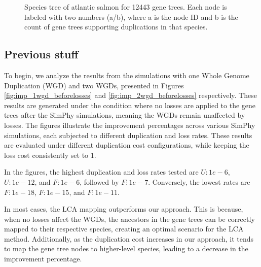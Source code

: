 \documentclass[10pt]{article}
\begin{document}
\begin{figure}[h!]
    \caption{
        Species tree of atlantic salmon for 12443 gene trees. Each node is labeled with two numbers (a/b), where a is the node ID and b is the count of gene trees supporting duplications in that species.
    }
    \label{fig:salmon}
\end{figure}


\clearpage
\subsection*{Previous stuff}

To begin, we analyze the results from the simulations with one Whole Genome Duplication (WGD) and two WGDs, presented in Figures \ref{fig:imp_1wgd_beforelosses} and \ref{fig:imp_2wgd_beforelosses} respectively. These results are generated under the condition where no losses are applied to the gene trees after the SimPhy simulations, meaning the WGDs remain unaffected by losses. The figures illustrate the improvement percentages across various SimPhy simulations, each subjected to different duplication and loss rates. These results are evaluated under different duplication cost configurations, while keeping the loss cost consistently set to 1.

In the figures, the highest duplication and loss rates tested are $U:1e-6$, $U:1e-12$, and $F:1e-6$, followed by $F:1e-7$. Conversely, the lowest rates are $F:1e-18$, $F:1e-15$, and $F:1e-11$.

In most cases, the LCA mapping outperforms our approach. This is because, when no losses affect the WGDs, the ancestors in the gene trees can be correctly mapped to their respective species, creating an optimal scenario for the LCA method. Additionally, as the duplication cost increases in our approach, it tends to map the gene tree nodes to higher-level species, leading to a decrease in the improvement percentage.
\end{document}
